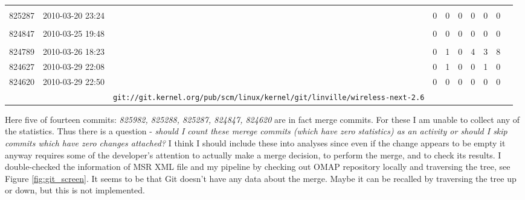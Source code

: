 \documentclass[a4paper,10pt]{article}
\numberwithin{equation}{subsection}
\begin{document}
\begin{table}[hb]
\begin{minipage}{\textwidth}
\begin{tabularx}{\textwidth}{ | l | l | X | r | r | r | r | r | r | r |}
& & \verb1git://git.kernel.org/pub/scm/linux/kernel/git/mst/vhost1 &  &  &  &  &  & \\  
825287 & 2010-03-20 23:24 & \verb1Merge branch 'master' of 1 & 0 & 0 & 0 & 0 & 0 & 0\\ 
& & \verb1master.kernel.org:/pub/scm/linux/kernel/git/davem/net-2.61 &  &  &  &  &  & \\  
824847 & 2010-03-25 19:48 & \verb1Merge branch 'master' of 1 & 0 & 0 & 0 & 0 & 0 & 0\\ 
& & \verb1git://git.kernel.org/pub/scm/linux/kernel/git/kaber/nf-2.61 &  &  &  &  &  & \\  
824789 & 2010-03-26 18:23 & \verb7Revert r8169: enable 64-bit DMA by default for PCI Express devices (v2)"7 & 0 & 1 & 0 & 4 & 3 & 8\\ 
824627 & 2010-03-29 22:08 & \verb1sparc64: Properly truncate pt_regs framepointer in perf callback.1 & 0 & 1 & 0 & 0 & 1 & 0\\ 
824620 & 2010-03-29 22:50 & \verb9Merge branch 'master' of 9 & 0 & 0 & 0 & 0 & 0 & 0\\
& & \verb+git://git.kernel.org/pub/scm/linux/kernel/git/linville/wireless-next-2.6+ &  &  &  &  &  & \\  
\hline           
  \end{tabularx}
\end{minipage}
  \label{tab:origins}
\end{table}

Here five of fourteen commits: \emph{825982, 825288, 825287, 824847, 824620} are in fact merge commits. For these
I am unable to collect any of the statistics. Thus there is a question - \textit{should I count these merege commits 
(which have zero statistics) as an activity or should I skip commits which have
zero changes attached?} I think I should include these into analyses since even if the change appears to be empty
it anyway requires some of the developer's attention to actually make a merge decision, to perform the merge, 
and to check its results. I double-checked the information of MSR XML file and my pipeline by checking out OMAP 
repository locally and traversing 
the tree, see Figure \ref{fig:git_screen}. It seems to be that Git doesn't have any data about the merge. 
Maybe it can be recalled by traversing the tree up or down, but this is not implemented.
\end{document}
